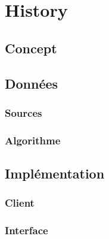 \section{History}

	\subsection{Concept}

	\subsection{Données}

		\subsubsection{Sources}

		\subsubsection{Algorithme}

	\subsection{Implémentation}

		\subsubsection{Client}

		\subsubsection{Interface}